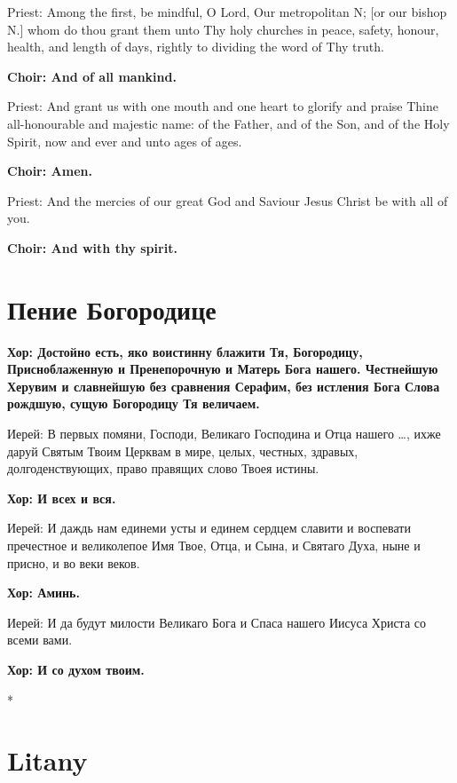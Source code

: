 \documentclass[12pt,a4paper,titlepage]{report}
\begin{document}
\begin{paracol}[1]{2}
  Priest: Among the first, be mindful, O Lord, Our metropolitan N; [or our bishop N.] whom do thou grant them unto Thy holy churches in peace, safety, honour, health, and length of days, rightly to dividing the word of Thy truth.

  \textbf{Choir: And of all mankind.}

  Priest: And grant us with one mouth and one heart to glorify and praise Thine all-honourable and majestic name: of the Father, and of the Son, and of the Holy Spirit, now and ever and unto ages of ages.

  \textbf{Choir: Amen.}

  Priest: And the mercies of our great God and Saviour Jesus Christ be with all of you.

  \textbf{Choir: And with thy spirit.}

  \switchcolumn[1]

  \section*{Пение Богородице}

  \textbf{Хор: Достойно есть, яко воистинну блажити Тя, Богородицу, Присноблаженную и Пренепорочную и Матерь Бога нашего. Честнейшую Херувим и славнейшую без сравнения Серафим, без истления Бога Слова рождшую, сущую Богородицу Тя величаем.}

  Иерей: В первых помяни, Господи, Великаго Господина и Отца нашего \ldots, ихже даруй Святым Твоим Церквам в мире, целых, честных, здравых, долгоденствующих, право правящих слово Твоея истины.

  \textbf{Хор: И всех и вся.}

  Иерей: И даждь нам единеми усты и единем сердцем славити и воспевати пречестное и великолепое Имя Твое, Отца, и Сына, и Святаго Духа, ныне и присно, и во веки веков.

  \textbf{Хор: Аминь.}

  Иерей: И да будут милости Великаго Бога и Спаса нашего Иисуса Христа со всеми вами.

  \textbf{Хор: И со духом твоим.}

  \switchcolumn[0]*

  \section*{Litany}


\end{paracol}
\end{document}
